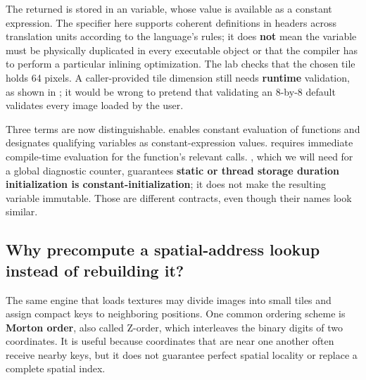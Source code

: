 The returned  is stored in an  variable, whose value is available as a constant expression. The  specifier here supports coherent definitions in headers across translation units according to the language's rules; it does \textbf{not} mean the variable must be physically duplicated in every executable object or that the compiler has to perform a particular inlining optimization. The lab checks that the chosen tile holds 64 pixels. A caller-provided tile dimension still needs \textbf{runtime} validation, as shown in ; it would be wrong to pretend that validating an 8-by-8 default validates every image loaded by the user.

Three terms are now distinguishable.  enables constant evaluation of functions and designates qualifying variables as constant-expression values.  requires immediate compile-time evaluation for the function's relevant calls. , which we will need for a global diagnostic counter, guarantees \textbf{static or thread storage duration initialization is constant-initialization}; it does not make the resulting variable immutable. Those are different contracts, even though their names look similar.

\subsection{Why precompute a spatial-address lookup instead of rebuilding it?}\label{05-engine-i-ch005-why-precompute-a-spatial-address-lookup-instead-of-rebuilding-it}

\hypertarget{05-engine-i-ch005-why-precompute-a-spatial-address-lookup-instead-of-rebuilding-it}{}

The same engine that loads textures may divide images into small tiles and assign compact keys to neighboring positions. One common ordering scheme is \textbf{Morton order}, also called Z-order, which interleaves the binary digits of two coordinates. It is useful because coordinates that are near one another often receive nearby keys, but it does not guarantee perfect spatial locality or replace a complete spatial index.

